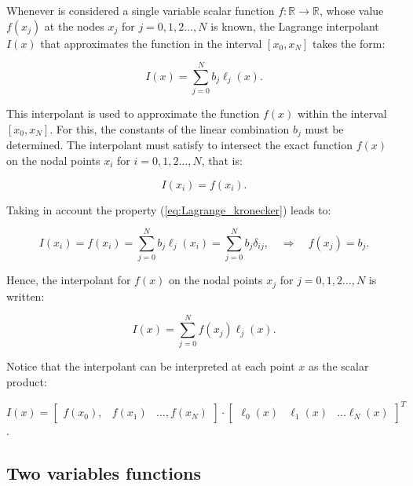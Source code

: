     Whenever is considered a single variable scalar function $f:\mathbb{R}\rightarrow\mathbb{R}$, whose value $f(x_j)$ at the nodes $x_j$ for $j=0,1,2\ldots,N$ is known,
     the Lagrange interpolant $I(x)$ that approximates the function in the interval $[x_0,x_N]$ takes the form:
     
     \begin{equation}
     	I(x) = \sum_{j=0}^{N}   b_j\ell_j (x).
     \end{equation}
    
    This interpolant is used to approximate the function $f(x)$ within the interval $[x_0,x_N]$. For this, the constants of the linear combination $b_j$ must be determined. The interpolant must satisfy to intersect the exact function $f(x)$ on the nodal points $x_i$ for $i=0,1,2\ldots,N$, that is:
    
    \begin{equation}
    	I(x_i) = f(x_i).
    \end{equation}
    
    Taking in account the property (\ref{eq:Lagrange_kronecker}) leads to:
    
    \begin{equation}
    I(x_i) = f(x_i) = \sum_{j=0}^{N}   b_j\ell_j (x_i) =\sum_{j=0}^{N}   b_j \delta_{ij}, \quad \Rightarrow \quad f(x_j) = b_j.
    \end{equation}
    
    Hence, the interpolant for $f(x)$ on the nodal points $x_j$ for $j=0,1,2\ldots,N$ is written:
    
    \begin{equation}
    I(x) = \sum_{j=0}^{N}  f(x_j) \ell_j (x).
    \end{equation}
    
    Notice that the interpolant can be interpreted at each point $x$ as the scalar product:
    
    \begin{equation}
    I(x) = 
    \begin{bmatrix}
    f(x_0), & f(x_1) & \ldots, f(x_N)
    \end{bmatrix} \cdot
    {\begin{bmatrix}
    \ell_0 (x) & \ell_1 (x) & \ldots  \ell_N (x)
    \end{bmatrix}}^T
    \end{equation}.
    
    
    \subsection{Two variables functions}
    
